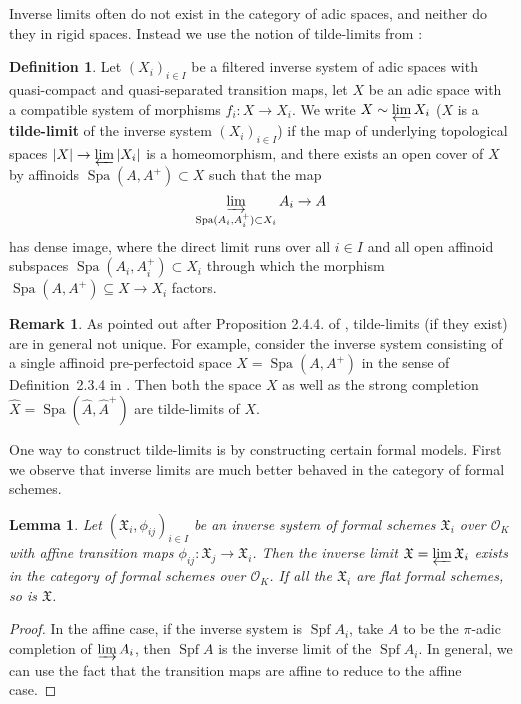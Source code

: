\documentclass[10pt,oneside]{amsart}
\newtheorem{lemma}[theorem]{Lemma}
\theoremstyle{definition}
\newtheorem{definition}[theorem]{Definition}
\newtheorem{remark}[theorem]{Remark}
\begin{document}
	Inverse limits often do not exist in the category of adic spaces, and neither do they in rigid spaces. Instead we use the notion of tilde-limits from \cite{SW}:
	
	\begin{definition} 
Let $(X_i)_{i\in I}$ be a filtered inverse system of adic spaces with quasi-compact and quasi-separated transition maps, let $X$ be an adic space with a compatible system of morphisms $f_i: X \rightarrow X_i$. We write $X \sim \varprojlim X_i$ ($X$ is a \textbf{tilde-limit} of the inverse system $(X_i)_{i\in I}$) if the map of underlying topological spaces $|X| \rightarrow \varprojlim |X_i|$ is a homeomorphism, and there exists an open cover of $X$ by affinoids $\operatorname{Spa} (A, A^+) \subset X$ such that the map 
$$ \varinjlim_{\operatorname{Spa}(A_i, A_i^+) \subset X_i} A_i \rightarrow A$$
has dense image, where the direct limit runs over all $i\in I$ and all open affinoid subspaces $\operatorname{Spa}(A_i, A_i^+) \subset X_i$ through which the morphism $\operatorname{Spa}(A, A^+) \subseteq X\rightarrow X_i$ factors.
	\end{definition}
	
	\begin{remark} \label{remark:tilde_limit_non_unique}
As pointed out after Proposition 2.4.4. of \cite{SW}, tilde-limits (if they exist) are in general not unique. For example, consider the inverse system consisting of a single affinoid pre-perfectoid space $X = \operatorname{Spa}(A, A^+)$ in the sense of Definition~2.3.4 in \cite{SW}. Then both the space $X$ as well as the strong completion $\hat X = \operatorname{Spa}(\hat A,\hat A^+)$ are tilde-limits of $X$. 
	\end{remark}
	
One way to construct tilde-limits is by constructing certain formal models. First we observe that inverse limits are much better behaved in the category of formal schemes. 

	\begin{lemma} \label{lemma:inverse_limit_formal}
		Let $(\mathfrak X_i,\phi_{ij})_{i\in I}$ be an inverse system of formal schemes $\mathfrak X_i$ over $\mathcal O_K$ with affine transition maps $\phi_{ij}:\mathfrak X_j\rightarrow \mathfrak X_i$. Then the inverse limit $\mathfrak X=\varprojlim \mathfrak X_i$ exists in the category of formal schemes over $\mathcal O_K$. If all the $\mathfrak X_i$ are flat formal schemes, so is $\mathfrak X$.
	\end{lemma}
	\begin{proof}
	In the affine case, if the inverse system is $\operatorname{Spf} A_i$, take $A$ to be the $\pi$-adic completion of $\varinjlim A_i$, then  $\operatorname{Spf} A$ is the inverse limit of the $\operatorname{Spf}A_i$. In general, we can use the fact that the transition maps are affine to reduce to the affine case. 
	\end{proof}
	
\end{document}
